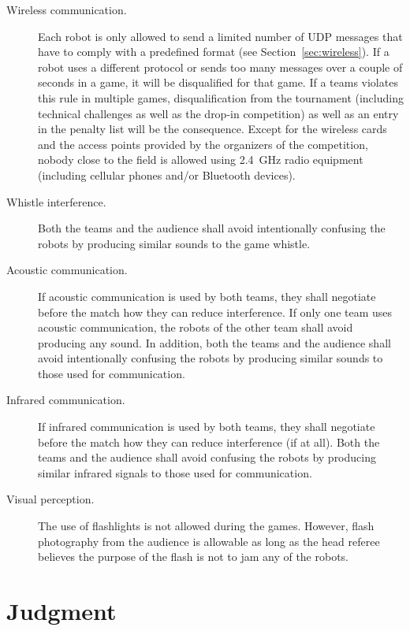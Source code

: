 \documentclass[12pt]{article}
\newcommand{\cf}{see\xspace}
\begin{document}
\begin{description}

\item[Wireless communication.] Each robot is only allowed to send a limited number of UDP messages that have to comply with a predefined format (\cf Section~\ref{sec:wireless}). If a robot uses a different protocol or sends too many messages over a couple of seconds in a game, it will be disqualified for that game. If a teams violates this rule in multiple games, disqualification from the tournament (including technical challenges as well as the drop-in competition) as well as an entry in the penalty list will be the consequence. Except for the wireless cards and the access points provided by the organizers of the competition, nobody close to the field is allowed using 2.4~GHz radio equipment (including cellular phones and/or Bluetooth devices).

\item[Whistle interference.] Both the teams and the audience shall avoid intentionally confusing the robots by producing similar sounds to the game whistle.

\item[Acoustic communication.] If acoustic communication is used by both teams, they shall negotiate before the match how they can reduce interference. If only one team uses acoustic communication, the robots of the other team shall avoid producing any sound. In addition, both the teams and the audience shall avoid intentionally confusing the robots by producing similar sounds to those used for communication.

\item[Infrared communication.] If infrared communication is used by both teams, they shall negotiate before the match how they can reduce interference (if at all). Both the teams and the audience shall avoid confusing the robots by producing similar infrared signals to those used for communication.

\item[Visual perception.] The use of flashlights is not allowed during the games.  However, flash photography from the audience is allowable as long as the head referee believes the purpose of the flash is not to jam any of the robots.

\end{description}


\newpage


\section{Judgment}
\end{document}
